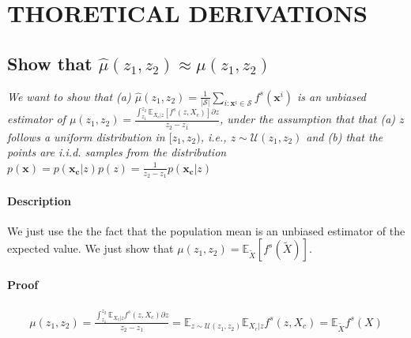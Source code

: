 \documentclass[twoside]{article}
\newcommand{\xc}{\mathbf{x_c}}
\newcommand{\xb}{\mathbf{x}}
\begin{document}
%

%

\onecolumn
{}

\section{THORETICAL DERIVATIONS}

\subsection{Show that \(\hat{\mu}(z_1, z_2) \approx \mu(z_1, z_2)\)}

\textit{We want to show that (a)
  \(\hat{\mu}(z_1, z_2) = \frac{1}{|\mathcal{S}|} \sum_{i:
    \mathbf{x}^i \in \mathcal{S}} f^s(\mathbf{x}^i) \) is an unbiased
  estimator of
  \(\mu(z_1, z_2) = \frac{\int_{z_1}^{z_2} \mathbb{E}_{X_c|z} \left [
      f^s(z, X_c) \right ] \partial z}{z_2 - z_1} \), under the
  assumption that that (a) \(z\) follows a uniform distribution in
  \([z_1, z_2)\), i.e., \(z \sim \mathcal{U}(z_1, z_2)\) and (b) that
  the points are i.i.d.  samples from the distribution
  \(p(\xb) = p(\xc|z)p(z) = \frac{1}{z_2-z_1}p(\xc|z) \) }

\paragraph{Description}
  We just use the the fact that the population mean is an
  unbiased estimator of the expected value. We just show that
  \(\mu(z_1, z_2) = \mathbb{E}_{\tilde{X}} [f^s(\tilde{X})]\).

\paragraph{Proof}
\begin{align}
  \mu(z_1, z_2) = \frac{\int_{z_1}^{z_2} \mathbb{E}_{X_c|z} f^s(z, X_c)  \partial z}{z_2 - z_1}
                = \mathbb{E}_{z \sim \mathcal{U}(z_1, z_2)}\mathbb{E}_{X_c|z} f^s(z, X_c)
                = \mathbb{E}_{\tilde{X}} f^s(X)
\end{align}
\end{document}
